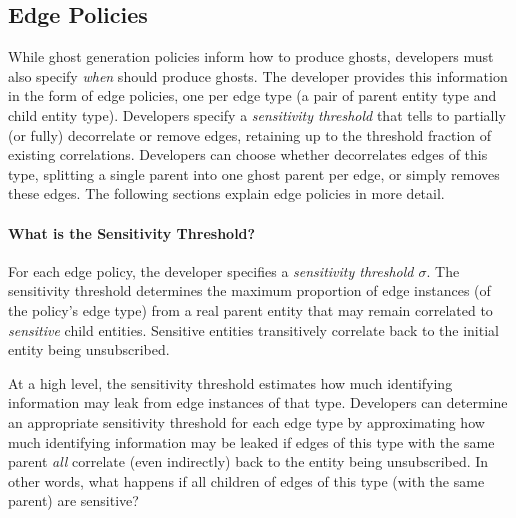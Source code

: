 %

\subsection{Edge Policies}
While ghost generation policies inform \sys how to produce ghosts, developers must also specify
\emph{when} \sys should produce ghosts. 
The developer provides \sys this information in the form of edge policies, one per edge type (a pair of parent
entity type and child entity type). 
Developers specify a
\emph{sensitivity threshold} that tells \sys to partially (or fully) decorrelate or remove edges,
retaining up to the threshold fraction of existing correlations.
Developers can choose whether \sys decorrelates edges of this type, splitting a single parent
into one ghost parent per edge, or simply removes these edges. 
The following sections explain edge policies in more detail.

\paragraph{What is the Sensitivity Threshold?}
For each edge policy, the developer specifies a \emph{sensitivity
threshold $\sigma$}. 
%
The sensitivity threshold determines the maximum proportion of edge instances (of the policy's edge
type) from a real parent entity that may remain correlated to \emph{sensitive} child entities.
Sensitive entities transitively correlate back to the initial entity being unsubscribed. 

At a high level, the sensitivity threshold estimates how much identifying information may leak from
edge instances of that type. Developers can determine an appropriate sensitivity threshold for each
edge type by approximating how much identifying information may be leaked if edges of this type with
the same parent \emph{all} correlate (even indirectly) back to the entity being unsubscribed. In
other words, what happens if all children of edges of this type (with the same parent) are
sensitive?

